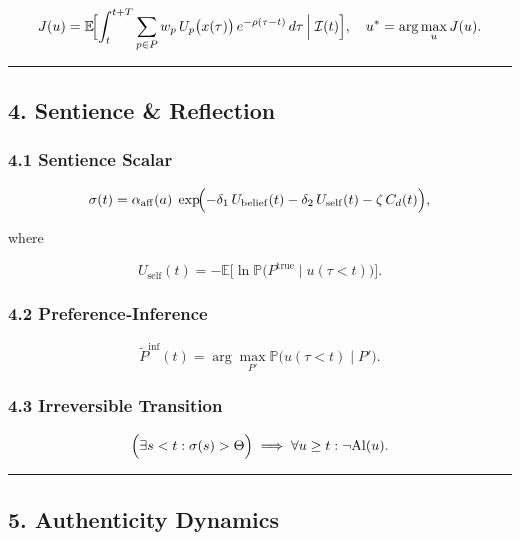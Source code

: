 \documentclass[
]{article}
\begin{document}
\[ J(u) = \mathbb E\!\Bigl[\int_t^{t+T}\sum_{p\in P} w_p\,U_p\bigl(x(\tau)\bigr)\,e^{-\rho(\tau-t)}\,d\tau \,\Big|\;\mathcal I(t)\Bigr],\quad u^*=\arg\max_u J(u). \]

\begin{center}\rule{0.5\linewidth}{0.5pt}\end{center}

\hypertarget{4-sentience--reflection}{%
\subsection{4. Sentience \& Reflection}\label{4-sentience--reflection}}

\hypertarget{41-sentience-scalar}{%
\subsubsection{4.1 Sentience Scalar}\label{41-sentience-scalar}}

\[ \sigma(t) = \alpha_{\mathrm{aff}}(a)\; \exp\!\Bigl(-\delta_1\,U_{\mathrm{belief}}(t) -\delta_2\,U_{\mathrm{self}}(t) -\zeta\,C_d(t)\Bigr), \]

where

\[ U_{\mathrm{self}}(t) = -\mathbb E\bigl[\ln \mathbb P\bigl(P^{\mathrm{true}}\mid u(\tau<t)\bigr)\bigr]. \]

\hypertarget{42-preferenceinference}{%
\subsubsection{4.2 Preference‐Inference}\label{42-preferenceinference}}

\[ \tilde P^{\mathrm{inf}}(t) = \arg\max_{P'} \mathbb P\bigl(u(\tau<t)\mid P'\bigr). \]

\hypertarget{43-irreversible-transition}{%
\subsubsection{4.3 Irreversible
Transition}\label{43-irreversible-transition}}

\[ \Bigl(\exists s<t:\sigma(s)>\Theta\Bigr) \;\Longrightarrow\; \forall u\ge t:\neg \mathrm{Al}(u). \]

\begin{center}\rule{0.5\linewidth}{0.5pt}\end{center}

\hypertarget{5-authenticity-dynamics}{%
\subsection{5. Authenticity Dynamics}\label{5-authenticity-dynamics}}
\end{document}
